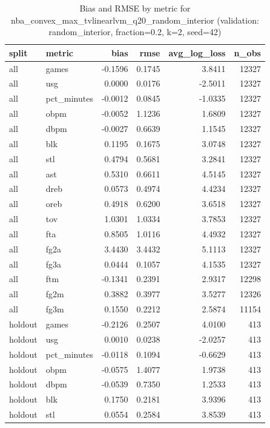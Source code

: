 \begin{table}
\caption{Bias and RMSE by metric for nba_convex_max_tvlinearlvm_q20_random_interior (validation: random_interior, fraction=0.2, k=2, seed=42)}
\label{tab:nba_convex_max_tvlinearlvm_q20_random_interior_vs_random_interior_f20_k2_s42_bias_rmse}
\begin{tabular}{llrrrr}
\toprule
split & metric & bias & rmse & avg\_log\_loss & n\_obs \\
\midrule
all & games & -0.1596 & 0.1745 & 3.8411 & 12327 \\
all & usg & 0.0000 & 0.0176 & -2.5011 & 12327 \\
all & pct\_minutes & -0.0012 & 0.0845 & -1.0335 & 12327 \\
all & obpm & -0.0052 & 1.1236 & 1.6809 & 12327 \\
all & dbpm & -0.0027 & 0.6639 & 1.1545 & 12327 \\
all & blk & 0.1195 & 0.1675 & 3.0748 & 12327 \\
all & stl & 0.4794 & 0.5681 & 3.2841 & 12327 \\
all & ast & 0.5310 & 0.6611 & 4.5145 & 12327 \\
all & dreb & 0.0573 & 0.4974 & 4.4234 & 12327 \\
all & oreb & 0.4918 & 0.6200 & 3.6518 & 12327 \\
all & tov & 1.0301 & 1.0334 & 3.7853 & 12327 \\
all & fta & 0.8505 & 1.0116 & 4.4932 & 12327 \\
all & fg2a & 3.4430 & 3.4432 & 5.1113 & 12327 \\
all & fg3a & 0.0444 & 0.1057 & 4.1535 & 12327 \\
all & ftm & -0.1341 & 0.2391 & 2.9317 & 12298 \\
all & fg2m & 0.3882 & 0.3977 & 3.5277 & 12326 \\
all & fg3m & 0.1550 & 0.2212 & 2.5874 & 11154 \\
holdout & games & -0.2126 & 0.2507 & 4.0100 & 413 \\
holdout & usg & 0.0010 & 0.0238 & -2.0257 & 413 \\
holdout & pct\_minutes & -0.0118 & 0.1094 & -0.6629 & 413 \\
holdout & obpm & -0.0575 & 1.4077 & 1.9738 & 413 \\
holdout & dbpm & -0.0539 & 0.7350 & 1.2533 & 413 \\
holdout & blk & 0.1750 & 0.2181 & 3.9396 & 413 \\
holdout & stl & 0.0554 & 0.2584 & 3.8539 & 413 \\

\end{tabular}
\end{table}
